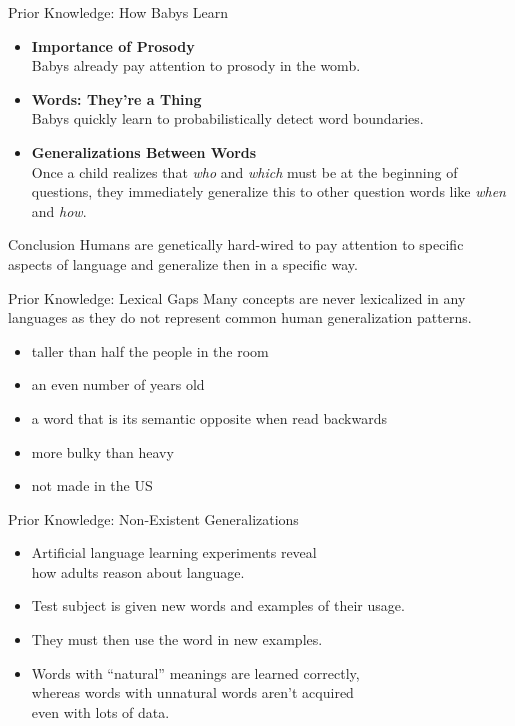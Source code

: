 \documentclass[xcolor={usenames,svgnames,x11names,dvipsnames,table}]{beamer}
\begin{document}
\begin{frame}{Prior Knowledge: How Babys Learn}
    \begin{itemize}
        \item \textbf{Importance of Prosody}\\
            Babys already pay attention to prosody in the womb.
        \item \textbf{Words: They're a Thing}\\
            Babys quickly learn to probabilistically detect word boundaries.
        \item \textbf{Generalizations Between Words}\\
            Once a child realizes that \emph{who} and \emph{which} must be at the beginning of questions, they immediately generalize this to other question words like \emph{when} and \emph{how}.
    \end{itemize}

    \begin{block}{Conclusion}
        Humans are genetically hard-wired to pay attention to specific aspects of language and generalize then in a specific way.
    \end{block}
\end{frame}

\begin{frame}{Prior Knowledge: Lexical Gaps}
    Many concepts are never lexicalized in any languages as they do not represent common human generalization patterns.
    \begin{example}
        \begin{itemize}
            \item taller than half the people in the room
            \item an even number of years old
            \item a word that is its semantic opposite when read backwards
            \item more bulky than heavy
            \item not made in the US
        \end{itemize}
    \end{example}
\end{frame}

\begin{frame}{Prior Knowledge: Non-Existent Generalizations}
    \begin{itemize}
        \item Artificial language learning experiments reveal\\
            how adults reason about language.
        \item Test subject is given new words and examples of their usage.
        \item They must then use the word in new examples.
        \item Words with ``natural'' meanings are learned correctly,\\
            whereas words with unnatural words aren't acquired\\
            even with lots of data.
    \end{itemize}
\end{frame}
\end{document}
